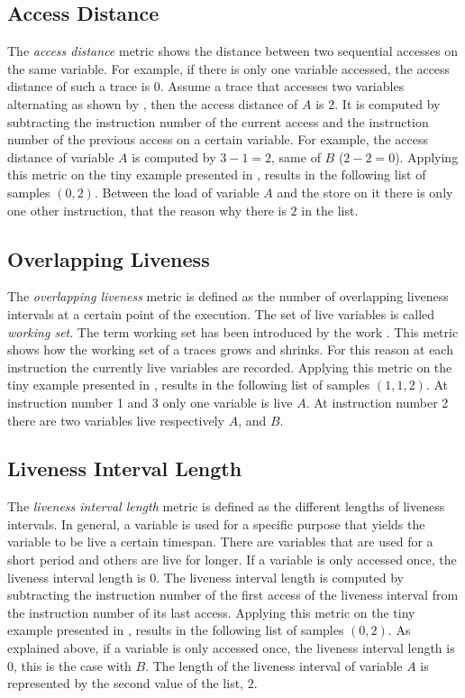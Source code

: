 \documentclass[onecolumn, openright, master, english, signatures]{dbrgrptt}
\begin{document}
\subsection{Access Distance}\label{ssec:metric-access-distance}
The \emph{access distance} metric shows the distance between two sequential accesses on the same variable.
For example, if there is only one variable accessed, the access distance of such a \ac{trace} is 0.
Assume a \ac{trace} that accesses two variables alternating as shown by , then the access distance of $A$ is 2.
It is computed by subtracting the instruction number of the current access and the instruction number of the previous access on a certain variable.
For example, the access distance of variable $A$ is computed by $3-1 = 2$, same of $B$ ($2 - 2 = 0$).
Applying this metric on the tiny example presented in , results in the following list of samples $(0, 2)$.
Between the load of variable $A$ and the store on it there is only one other instruction, that the reason why there is $2$ in the list.

\subsection{Overlapping Liveness}\label{ssec:metric-concurrently-live}
The \emph{overlapping liveness} metric is defined as the number of overlapping liveness intervals at a certain point of the execution.
The set of live variables is called \emph{working set}.
The term working set has been introduced by the work \cite{denning1968working}.
This metric shows how the working set of a \ac{trace}s grows and shrinks.
For this reason at each instruction the currently live variables are recorded.
Applying this metric on the tiny example presented in , results in the following list of samples $(1, 1, 2)$.
At instruction number 1 and 3 only one variable is live $A$.
At instruction number 2 there are two variables live respectively $A$, and $B$.

\subsection{Liveness Interval Length}\label{ssec:metric-liveness-interval-length}
The \emph{liveness interval length} metric is defined as the different lengths of liveness intervals.
In general, a variable is used for a specific purpose that yields the variable to be live a certain timespan.
There are variables that are used for a short period and others are live for longer.
If a variable is only accessed once, the liveness interval length is $0$.
The liveness interval length is computed by subtracting the instruction number of the first access of the liveness interval from the instruction number of its last access.
Applying this metric on the tiny example presented in , results in the following list of samples $(0, 2)$.
As explained above, if a variable is only accessed once, the liveness interval length is $0$, this is the case with $B$.
The length of the liveness interval of variable $A$ is represented by the second value of the list, $2$.
\end{document}
